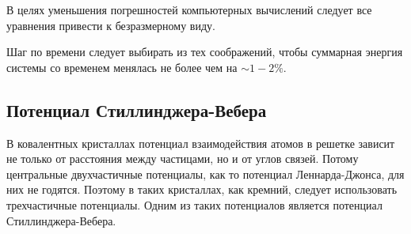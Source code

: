\documentclass[12pt,a4paper]{article}
\begin{document}
            В целях уменьшения погрешностей компьютерных вычислений следует все уравнения привести к безразмерному виду.

            Шаг по времени следует выбирать из тех соображений, чтобы суммарная энергия системы со временем менялась не более чем на $\sim 1-2\%$.


        \subsection{Потенциал Стиллинджера-Вебера}

            В ковалентных кристаллах потенциал взаимодействия атомов в решетке зависит не только от расстояния между частицами, но и от углов связей. Потому центральные двухчастичные потенциалы, как то потенциал Леннарда-Джонса, для них не годятся. Поэтому в таких кристаллах, как кремний, следует использовать трехчастичные потенциалы. Одним из таких потенциалов является потенциал Стиллинджера-Вебера.
\end{document}
